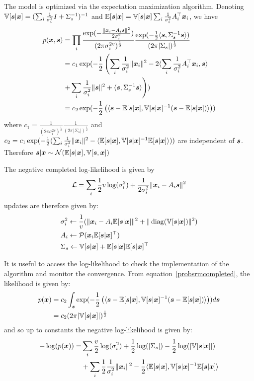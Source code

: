 The model is optimized via the expectation maximization algorithm.
Denoting $\mathbb{V}[\boldsymbol{s} | \boldsymbol{x}] = (\sum_i \frac1{\sigma_i^2} I +
\Sigma_s^{-1})^{-1}$ and $\mathbb{E}[\boldsymbol{s} | \boldsymbol{x}] = \mathbb{V}[\boldsymbol{s} | \boldsymbol{x}] \sum_i \frac1{\sigma_i^2}
A_i^{\top}\boldsymbol{x}_i$, we have
\begin{align}
  p(\boldsymbol{x}, \boldsymbol{s}) &= \prod_i \frac{\exp(-\frac{\|\boldsymbol{x}_i - A_i \boldsymbol{s} \|^2}{2 \sigma_i^2})}{(2 \pi \sigma_i^{2v})^{\frac12}} \frac{\exp(-\frac12 \langle \boldsymbol{s} , \Sigma_s^{-1} \boldsymbol{s} \rangle )}{(2 \pi | \Sigma_s|)^{\frac12}} \\
               &= c_1 \exp(-\frac12 \left( \sum_i \frac1{\sigma_i^2}\|\boldsymbol{x}_i\|^2 - 2  \langle \sum_i \frac1{\sigma_i^2} A_i^{\top}\boldsymbol{x}_i, \boldsymbol{s} \rangle \right. \\& \left.+ \sum_i \frac1{\sigma_i^2} \| \boldsymbol{s} \|^2 + \langle \boldsymbol{s}, \Sigma_s^{-1} \boldsymbol{s} \rangle  \right)) \\
               &= c_2 \exp(-\frac12 \left( \langle  \boldsymbol{s} - \mathbb{E}[\boldsymbol{s} | \boldsymbol{x}], \mathbb{V}[\boldsymbol{s} | \boldsymbol{x}]^{-1} ( \boldsymbol{s} - \mathbb{E}[\boldsymbol{s} | \boldsymbol{x}])  \rangle \right)) \label{probsrmcompleted}
\end{align}
where $c_1 = \frac1{(2 \pi \sigma_i^{2v})^{\frac12}}\frac1{(2 \pi |
  \Sigma_s|)^{\frac12}}$ and $c_2 = c_1 \exp(-\frac12( \sum_i
\frac1{\sigma_i^2}\|\boldsymbol{x}_i\|^2 - \langle  \mathbb{E}[\boldsymbol{s} | \boldsymbol{x}], \mathbb{V}[\boldsymbol{s} | \boldsymbol{x}]^{-1} \mathbb{E}[\boldsymbol{s} | \boldsymbol{x}] \rangle))$ are independent of $\boldsymbol{s}$.
Therefore $\boldsymbol{s}| \boldsymbol{x} \sim \mathcal{N}(\mathbb{E}[\boldsymbol{s} | \boldsymbol{x}], \mathbb{V}[\boldsymbol{s}, \boldsymbol{x}])$

The negative completed log-likelihood is given by
\begin{align}
	\mathcal{L} = \sum_i \frac12 v \log(\sigma_i^2) + \frac1{2 \sigma_i^2} \| \boldsymbol{x}_i - A_i \boldsymbol{s} \|^2
\end{align}
updates are therefore given by:
\begin{align}
&\sigma_i^2 \leftarrow \frac1{v} (\| \boldsymbol{x}_i - A_i \mathbb{E}[\boldsymbol{s}|\boldsymbol{x}]\|^2 + \| \operatorname*{diag}(\mathbb{V}[\boldsymbol{s} | \boldsymbol{x}]) \|^2) \\
  &A_i \leftarrow \mathcal{P}(\boldsymbol{x}_i \mathbb{E}[\boldsymbol{s}|\boldsymbol{x}]^{\top}) \label{eq:psrm:Aiupdate} \\
  & \Sigma_s \leftarrow \mathbb{V}[\boldsymbol{s} | \boldsymbol{x}] + \mathbb{E}[\boldsymbol{s} | \boldsymbol{x}] \mathbb{E}[\boldsymbol{s} | \boldsymbol{x}]^{\top}
\end{align}

It is useful to access the log-likelihood to check the implementation of the
algorithm and monitor the convergence. From equation~\eqref{probsrmcompleted},
the likelihood is given by:
\begin{align}
  p(\boldsymbol{x}) &= c_2 \int_{\boldsymbol{s}} \exp(-\frac12 \left( \langle  \boldsymbol{s} - \mathbb{E}[\boldsymbol{s} | \boldsymbol{x}], \mathbb{V}[\boldsymbol{s} | \boldsymbol{x}]^{-1} ( \boldsymbol{s} - \mathbb{E}[\boldsymbol{s} | \boldsymbol{x}])  \rangle \right)) d\boldsymbol{s} \\
         &= c_2 (2 \pi |\mathbb{V}[\boldsymbol{s} | \boldsymbol{x}]|)^{\frac12}
\end{align}
and so up to constants the negative log-likelihood is given by:
\begin{align}
  -\log(p(\boldsymbol{x})) = &\sum_i \frac{v}{2} \log(\sigma_i^2) + \frac12 \log(|\Sigma_s|) - \frac12 \log(|\mathbb{V}[\boldsymbol{s} | \boldsymbol{x}]|) \\ &+ \sum_i
  \frac12 \frac1{\sigma_i^2}\|\boldsymbol{x}_i\|^2 - \frac12 \langle  \mathbb{E}[\boldsymbol{s} | \boldsymbol{x}], \mathbb{V}[\boldsymbol{s} | \boldsymbol{x}]^{-1} \mathbb{E}[\boldsymbol{s} | \boldsymbol{x}] \rangle
\end{align}


